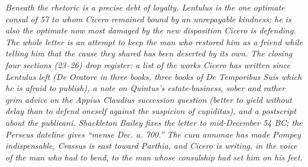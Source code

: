 \textit{Beneath the rhetoric is a precise debt of loyalty.
Lentulus is the one optimate consul of 57 to whom Cicero
remained bound by an unrepayable kindness; he is also the
optimate now most damaged by the new disposition Cicero is
defending. The whole letter is an attempt to keep the man who
restored him as a friend while telling him that the cause they
shared has been deserted by its own. The closing four
sections (23--26) drop register: a list of the works Cicero
has written since Lentulus left (\textit{De Oratore} in three
books, three books of \textit{De Temporibus Suis} which he is
afraid to publish), a note on Quintus's estate-business,
sober and rather grim advice on the Appius Claudius succession
question (better to yield without delay than to defend
oneself against the suspicion of \textit{cupiditas}), and a
postscript about the \textit{publicani}. Shackleton Bailey
fixes the letter to mid-December 54 BC; the Perseus dateline
gives ``\textit{mense Dec. a. 700}.'' The cura annonae has
made Pompey indispensable, Crassus is east toward Parthia, and
Cicero is writing, in the voice of the man who had to bend,
to the man whose consulship had set him on his feet.}
